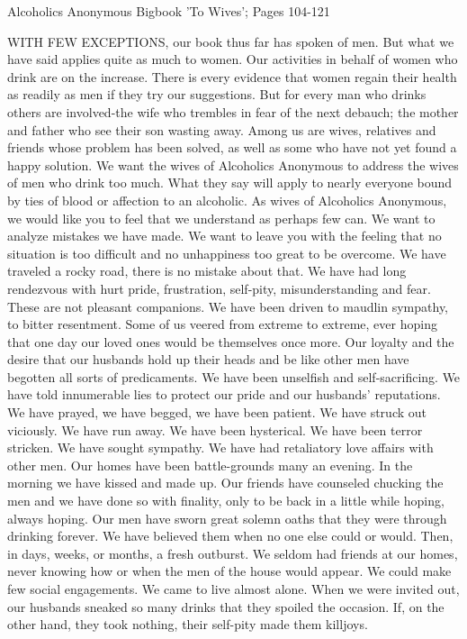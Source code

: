 
Alcoholics Anonymous Bigbook 'To Wives'; Pages 104-121

\begin{biblechapter}
WITH FEW EXCEPTIONS, our book thus far has spoken of men.  But what we have said applies quite as much to women.  Our activities in behalf of women who drink are on the increase.  There is every evidence that women regain their health as readily as men if they try our suggestions.
But for every man who drinks others are involved-the wife who trembles in fear of the next debauch; the mother and father who see their son wasting away.
Among us are wives, relatives and friends whose problem has been solved, as well as some who have not yet found a happy solution.  We want the wives of Alcoholics Anonymous to address the wives of men who drink too much.  What they say will apply to nearly everyone bound by ties of blood or affection to an alcoholic.
As wives of Alcoholics Anonymous, we would like you to feel that we understand as perhaps few can.  We want to analyze mistakes we have made.  We want to leave you with the feeling that no situation is too difficult and no unhappiness too great to be overcome.
We have traveled a rocky road, there is no mistake about that.  We have had long rendezvous with hurt pride, frustration, self-pity, misunderstanding and fear.  These are not pleasant companions.  We have been driven to maudlin sympathy, to bitter resentment.  Some of us veered from extreme to extreme, ever hoping that one day our loved ones would be themselves once more.
Our loyalty and the desire that our husbands hold up their heads and be like other men have begotten all sorts of predicaments.  We have been unselfish and self-sacrificing.  We have told innumerable lies to protect our pride and our husbands' reputations.  We have prayed, we have begged, we have been patient.  We have struck out viciously.  We have run away.  We have been hysterical.  We have been terror stricken.  We have sought sympathy.  We have had retaliatory love affairs with other men.
Our homes have been battle-grounds many an evening.  In the morning we have kissed and made up.  Our friends have counseled chucking the men and we have done so with finality, only to be back in a little while hoping, always hoping.  Our men have sworn great solemn oaths that they were through drinking forever.  We have believed them when no one else could or would.  Then, in days, weeks, or months, a fresh outburst.
We seldom had friends at our homes, never knowing how or when the men of the house would appear.  We could make few social engagements.  We came to live almost alone.  When we were invited out, our husbands sneaked so many drinks that they spoiled the occasion.  If, on the other hand, they took nothing, their self-pity made them killjoys.

\end{biblechapter}
